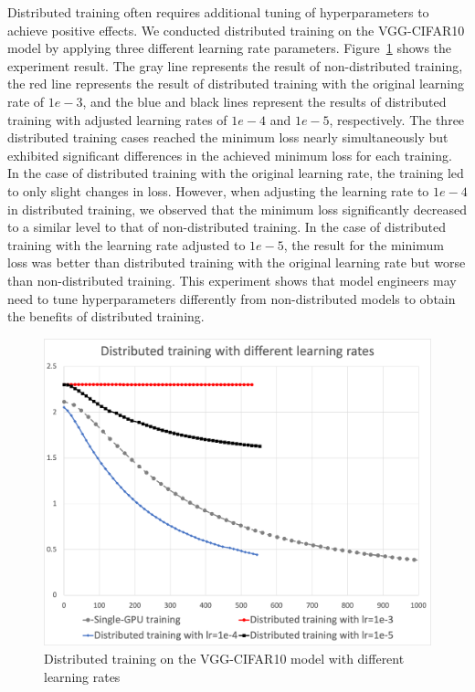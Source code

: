 Distributed training often requires additional tuning of hyperparameters to
achieve positive effects.
We conducted distributed training on the VGG-CIFAR10 model by applying three
different learning rate parameters.
Figure~\ref{fig:eval:cifar10} shows the experiment result.
The gray line represents the result of non-distributed training, the red line
represents the result of distributed training with the original learning rate
of $1e-3$, and the blue and black lines represent the results of distributed
training with adjusted learning rates of $1e-4$ and $1e-5$, respectively.
The three distributed training cases reached the minimum loss nearly
simultaneously but exhibited significant differences in the
achieved minimum loss for each training.
In the case of distributed training with the original learning rate, the
training led to only slight changes in loss.
However, when adjusting the learning rate to $1e-4$ in distributed training, 
we observed that the minimum loss significantly decreased to a similar level
to that of non-distributed training.
In the case of distributed training with the learning rate adjusted to $1e-5$,
the result for the minimum loss was better than distributed training with the
original learning rate but worse than non-distributed training.
This experiment shows that model engineers may need to tune hyperparameters
differently from non-distributed models to obtain the benefits of distributed
training.

\begin{figure}%
  \centering
  \includegraphics[width=.8\textwidth]{lr-exp-graph}
  \caption{Distributed training on the VGG-CIFAR10 model with different learning rates}
  \label{fig:eval:cifar10}
\end{figure}

